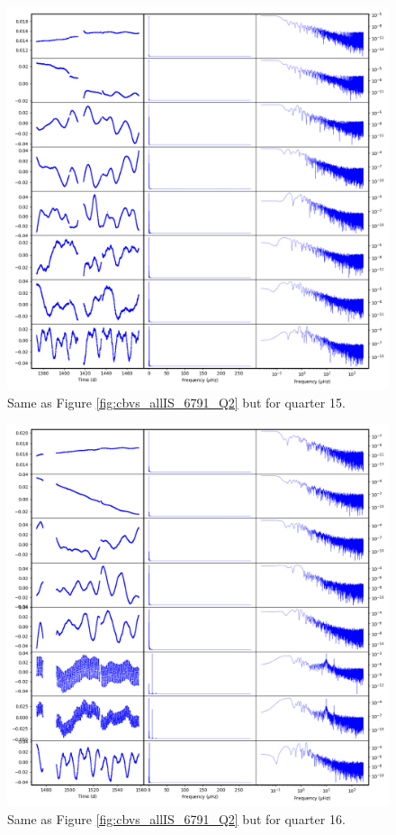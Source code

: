 \begin{figure}
    \centering
    \includegraphics[width=\linewidth]{Chapter_Appended/AppB/cbv_6791_q15.png}
    \caption{Same as Figure \ref{fig:cbvs_allIS_6791_Q2} but for quarter 15.}
    \label{fig:cbvs_allIS_6791_Q15}
\end{figure}


\begin{figure}
    \centering
    \includegraphics[width=\linewidth]{Chapter_Appended/AppB/cbv_6791_q16.png}
    \caption{Same as Figure \ref{fig:cbvs_allIS_6791_Q2} but for quarter 16.}
    \label{fig:cbvs_allIS_6791_Q16}
\end{figure}


